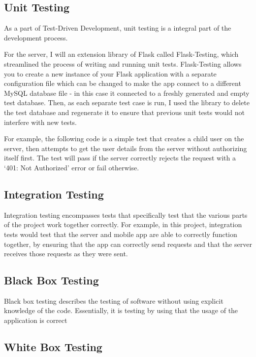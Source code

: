 \subsection{Unit Testing} 
As a part of Test-Driven Development, unit testing is a integral part of the development process.


For the server, I will an extension library of Flask called Flask-Testing, which streamlined the process of writing and running unit tests.
Flask-Testing allows you to create a new instance of your Flask application with a separate configuration file which can be changed to make the app connect to a different MySQL database file - in this case it connected to a freshly generated and empty test database.
Then, as each separate test case is run, I used the library to delete the test database and regenerate it to ensure that previous unit tests would not interfere with new tests.

For example, the following code is a simple test that creates a child user on the server, then attempts to get the user details from the server without authorizing itself first. 
The test will pass if the server correctly rejects the request with a `401: Not Authorized' error or fail otherwise.


\subsection{Integration Testing}
Integration testing encompasses tests that specifically test that the various parts of the project work together correctly.
For example, in this project, integration tests would test that the server and mobile app are able to correctly function together, by ensuring that the app can correctly send requests and that the server receives those requests as they were sent.


\subsection{Black Box Testing}
Black box testing describes the testing of software without using explicit knowledge of the code.
Essentially, it is testing by using that the usage of the application is correct

\subsection{White Box Testing}


